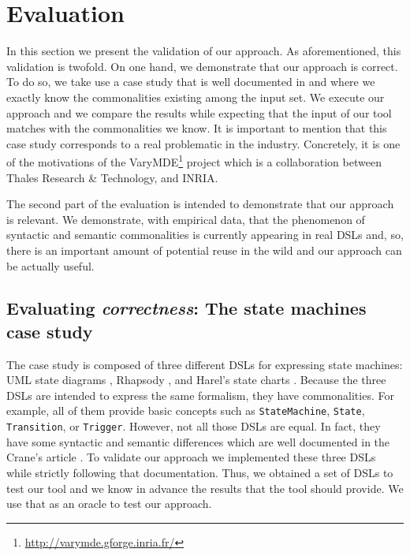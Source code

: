 \section{Evaluation}
\label{sec:validation}

In this section we present the validation of our approach. As aforementioned, this validation is twofold. On one hand, we demonstrate that our approach is correct. To do so, we take use a case study that is well documented in \cite{Crane:2007} and where we exactly know the commonalities existing among the input set. We execute our approach and we compare the results while expecting that the input of our tool matches with the commonalities we know. It is important to mention that this case study corresponds to a real problematic in the industry. Concretely, it is one of the motivations of the VaryMDE\footnote{\url{http://varymde.gforge.inria.fr/}} project which is a collaboration between Thales Research \& Technology, and INRIA.  

The second part of the evaluation is intended to demonstrate that our approach is relevant. We demonstrate, with empirical data, that the phenomenon of syntactic and semantic commonalities is currently appearing in real DSLs and, so, there is an important amount of potential reuse in the wild and our approach can be actually useful. 

\subsection{Evaluating \textit{correctness}: The state machines case study}

The case study is composed of three different DSLs for expressing state machines:  UML state diagrams \cite{UML:2011}, Rhapsody \cite{Harel:2004}, and Harel's state charts \cite{Harel:1996}. Because the three DSLs are intended to express the same formalism, they have commonalities. For example, all of them provide basic concepts such as \texttt{StateMachine}, \texttt{State}, \texttt{Transition}, or \texttt{Trigger}. However, not all those DSLs are equal. In fact, they have some syntactic and semantic differences which are well documented in the Crane's article \cite{Crane:2007}. To validate our approach we implemented these three DSLs while strictly following that documentation. Thus, we obtained a set of DSLs to test our tool and we know in advance the results that the tool should provide. We use that as an oracle to test our approach. 

